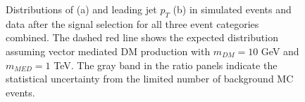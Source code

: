 \begin{figure}[hbtp]\begin{center}
 \caption{
   Distributions of \ETm (a) and leading jet $p_{T}$ (b) in simulated events and data after the signal selection for all three
   event categories combined. The dashed red line shows the expected distribution assuming vector mediated DM production with $m_{DM}=10$ GeV and $m_{MED}=1$ TeV.
   The gray band in the ratio panels indicate the statistical uncertainty from the limited number of background MC events.
 }
 \label{fig:ptandmet}\end{center}\end{figure}



